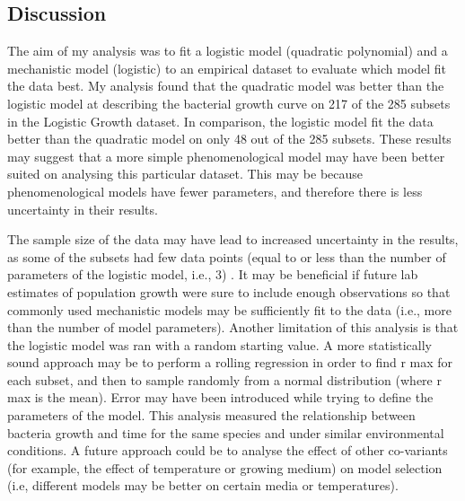 \documentclass{article}[11pt]
\begin{document}
\begin{flushleft}
\section{Discussion}
The aim of my analysis was to fit a logistic model (quadratic polynomial) and a mechanistic model (logistic) to an empirical dataset to evaluate which model fit the data best. My analysis found that the quadratic model was better than the logistic model at describing the bacterial growth curve on 217 of the 285 subsets in the Logistic Growth dataset. In comparison, the logistic model fit the data better than the quadratic model on only 48 out of the 285 subsets. These results may suggest that a more simple phenomenological model may have been better suited on analysing this particular dataset. This may be because phenomenological models have fewer parameters, and therefore there is less uncertainty in their results. \cite{white2019should}\cite{transtrum2016bridging}
\linebreak


The sample size of the data may have lead to increased uncertainty in the results, as some of the subsets had few data points (equal to or less than the number of parameters of the logistic model, i.e., 3) \cite{white2019should}. It may be beneficial if future lab estimates of population growth were sure to include enough observations so that commonly used mechanistic models may be sufficiently fit to the data (i.e., more than the number of  model parameters). Another limitation of this analysis is that the logistic model was ran with a random starting value. A more statistically sound approach may be to perform a rolling regression in order to find r max for each subset, and then to sample randomly from a normal distribution (where r max is the mean). Error may have been introduced while trying to define the parameters of the model. This analysis measured the relationship between bacteria growth and time for the same species and under similar environmental conditions. A future approach could be to analyse the effect of other co-variants (for example, the effect of temperature or growing medium) on model selection (i.e, different models may be better on certain media or temperatures). 
\linebreak


\end{flushleft}
\end{document}
